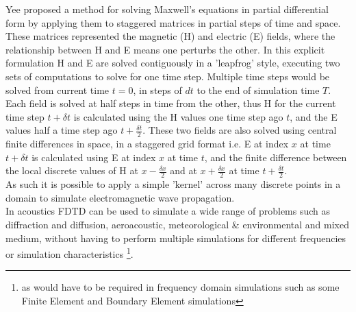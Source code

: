 Yee proposed a method for solving Maxwell's equations in partial differential form by applying them to staggered matrices in partial steps of time and space. These matrices represented the magnetic (H) and electric (E) fields, where the relationship between H and E means one perturbs the other. In this explicit formulation H and E are solved contiguously in a 'leapfrog' style, executing two sets of computations to solve for one time step. Multiple time steps would be solved from current time $t = 0$, in steps of $dt$ to the end of simulation time $T$.\\

Each field is solved at half steps in time from the other, thus H for the current time step $t + \delta t$ is calculated using the H values one time step ago $t$, and the E values half a time step ago $t + \frac{\delta t}{2} $. These two fields are also solved using central finite differences in space, in a staggered grid format i.e. E at index $x$ at time $t + \delta t$ is calculated using E at index $x$ at time $t$, and the finite difference between the local discrete values of H at $x - \frac{\delta x}{2} $ and at $x + \frac{\delta x}{2} $ at time $t + \frac{\delta t}{2}$.\\

As such it is possible to apply a simple 'kernel' across many discrete points in a domain to simulate electromagnetic wave propagation.\\
In acoustics FDTD can be used to simulate a wide range of problems such as diffraction and diffusion, aeroacoustic, meteorological \& environmental and mixed medium, without having to perform multiple simulations for different frequencies or simulation characteristics \footnote{as would have to be required in frequency domain simulations such as some Finite Element and Boundary Element simulations}. 

